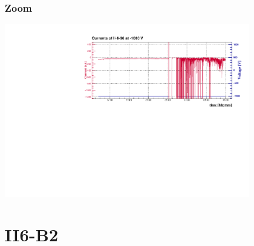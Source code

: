 \documentclass[9pt]{beamer}
\begin{document}
\begin{frame}
	\frametitle{Zoom}
	\vspace*{-15pt}
	\begin{center}
		\includegraphics[angle=270, width=11cm]{II-6-96_-1000Zoom}
	\end{center}
\end{frame}
\section{II6-B2}
\end{document}
